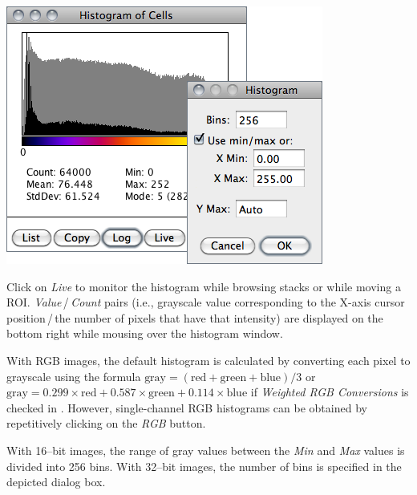 \begin{minipage}[c][1\totalheight][t]{0.537\columnwidth}%
\includegraphics[scale=0.55]{images/Histogram}%
\end{minipage}%
\begin{minipage}[c][1\totalheight][t]{0.463\columnwidth}%
Click on \emph{Live} to monitor the histogram while browsing stacks
or while moving a ROI.\emph{ Value}\,/\,\emph{Count} pairs (i.e.,
grayscale value corresponding to the X-axis cursor position\,/\,the
number of pixels that have that intensity) are displayed on the bottom
right while mousing over the histogram window.

\medskip{}
With RGB images, the default histogram is calculated
by converting each pixel to grayscale using the formula $\text{gray}=(\text{red}+\text{green}+\text{blue})/3$
or $\text{gray}=0.299\times\text{red}+0.587\times\text{green}+0.114\times\text{blue}$
if \emph{Weighted RGB Conversions} is checked in .
However, single-channel RGB histograms can be obtained by repetitively
clicking on the \emph{RGB} button.%
\end{minipage}

With 16--bit images, the range of gray values between the \emph{Min}
and \emph{Max} values is divided into 256 bins. With 32--bit images,
the number of bins is specified in the depicted dialog box.

